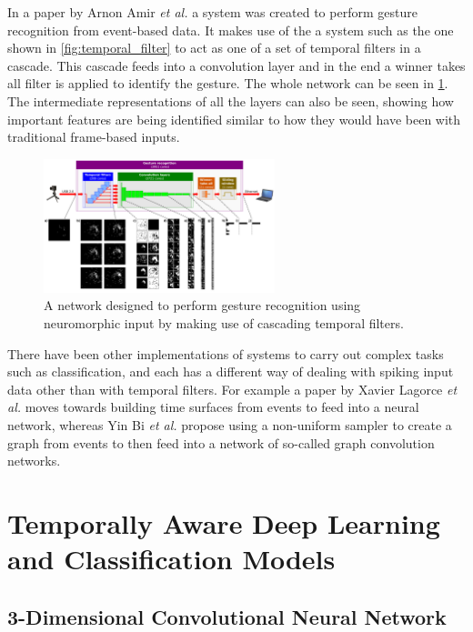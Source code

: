 In a paper by Arnon Amir \textit{et al.}\cite{eventBasedGestureRec} a system was created to perform gesture recognition from event-based data. It makes use of the a system such as the one shown in \cref{fig:temporal_filter} to act as one of a set of temporal filters in a cascade. This cascade feeds into a convolution layer and in the end a winner takes all filter is applied to identify the gesture. The whole network can be seen in \cref{fig:event_to_gesture_rec_network}. The intermediate representations of all the layers can also be seen, showing how important features are being identified similar to how they would have been with traditional frame-based inputs.

\begin{figure}[htb]
      \centering
      \includegraphics[width=0.6\textwidth]{background/images/event_to_gesture_rec_network.png}
      \caption{A network designed to perform gesture recognition using neuromorphic input by making use of cascading temporal filters\cite{eventBasedGestureRec}.}
      \label{fig:event_to_gesture_rec_network}
\end{figure}

There have been other implementations of systems to carry out complex tasks such as classification, and each has a different way of dealing with spiking input data other than with temporal filters. For example a paper by Xavier Lagorce \textit{et al.}\cite{eventsToTimeSurfaces} moves towards building time surfaces from events to feed into a neural network, whereas Yin Bi \textit{et al.}\cite{eventsToGraphs} propose using a non-uniform sampler to create a graph from events to then feed into a network of so-called graph convolution networks.

\section{Temporally Aware Deep Learning and Classification Models} \label{sec:temporally_aware_models}

\subsection{3-Dimensional Convolutional Neural Network} \label{ssec:3D_conv_network}

